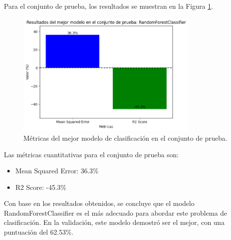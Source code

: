 Para el conjunto de prueba, los resultados se muestran en la Figura \ref{fig:metricas_clasificacion_bestModel}.

\begin{figure}[H]
    \centering
    \includegraphics[width=0.8\textwidth]{img/compara_algoritmos/metricasBestModelRandomForesClassifier.png}
    \caption{Métricas del mejor modelo de clasificación en el conjunto de prueba.}
    \label{fig:metricas_clasificacion_bestModel}
\end{figure}

Las métricas cuantitativas para el conjunto de prueba son:

\begin{itemize}
    \item Mean Squared Error: 36.3\%
    \item R2 Score: -45.3\%
\end{itemize}

Con base en los resultados obtenidos, se concluye que el modelo RandomForestClassifier es el más adecuado para abordar este problema de clasificación. En la validación, este modelo demostró ser el mejor, con una puntuación del 62.53\%.